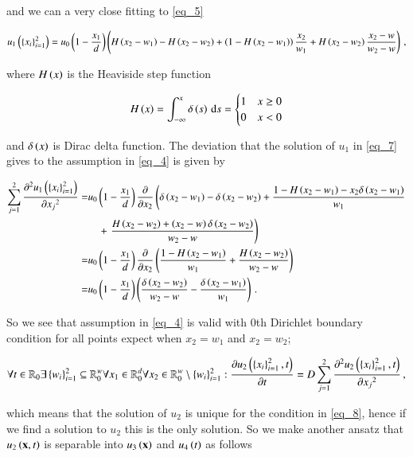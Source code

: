 \documentclass[11pt,english,a4paper]{article}
\begin{document}
\begin{flushleft}
and we can a very close fitting to \eqref{eq_5} 

\begin{align}
u_1\left({\left\lbrace{x_i}\right\rbrace_{i=1}^2}\right) = u_0\left({1-\frac{x_1}{d}}\right)\left({H\left({x_2-w_1}\right)-H\left({x_2-w_2}\right) + \left({1-H\left({x_2-w_1}\right)}\right)\frac{x_2}{w_1} + H\left({x_2-w_2}\right)\frac{x_2-w}{w_2-w}}\right) \,,
\label{eq_7}
\end{align}

where $H\left({x}\right)$ is the Heaviside step function

\begin{align*}
H\left({x}\right) = \int_{-\infty}^x \delta\left({s}\right)\,\mathrm{d}s = \begin{cases} 1 & x \geq 0 \\ 0 & x < 0 \end{cases}
\end{align*}

and $\delta\left({x}\right)$ is Dirac delta function. The deviation that the solution of $u_1$ in \eqref{eq_7} gives to the assumption in \eqref{eq_4} is given by

\begin{align*}
\sum_{j=1}^2 \frac{\partial ^2 u_1\left({\left\lbrace{x_i}\right\rbrace_{i=1}^2}\right)}{\partial {x_j}^2} 
=& u_0\left({1-\frac{x_1}{d}}\right)\frac{\partial}{\partial x_2}\left(\delta\left({x_2-w_1}\right)-\delta\left({x_2-w_2}\right) +\frac{1-H\left({x_2-w_1}\right) -x_2\delta\left({x_2-w_1}\right)}{w_1} \right.
\\
&\quad + \left. \frac{H\left({x_2-w_2}\right)+\left({x_2-w}\right)\delta\left({x_2-w_2}\right)}{w_2-w}\right)
\\
=& u_0\left({1-\frac{x_1}{d}}\right)\frac{\partial}{\partial x_2}\left({\frac{1-H\left({x_2-w_1}\right)}{w_1} + \frac{H\left({x_2-w_2}\right)}{w_2-w}}\right)
\\
=& u_0\left({1-\frac{x_1}{d}}\right)\left({\frac{\delta\left({x_2-w_2}\right)}{w_2-w} - \frac{\delta\left({x_2-w_1}\right)}{w_1}}\right) \,.
\end{align*}

So we see that assumption in \eqref{eq_4} is valid with 0th Dirichlet boundary condition for all points expect when $x_2=w_1$ and $x_2=w_2$;

\begin{align}
\forall t\in \mathbb{R}_0\exists\left\lbrace{w_i}\right\rbrace_{i=1}^2\subseteq \mathbb{R}_0^w \forall x_1\in \mathbb{R}_{0}^d \forall x_2\in\mathbb{R}_0^w \setminus \left\lbrace{w_i}\right\rbrace_{i=1}^2 : \frac{\partial u_2\left({\left\lbrace{x_i}\right\rbrace_{i=1}^2,t}\right)}{\partial t} = D\sum_{j=1}^2\frac{\partial^2 u_2\left({\left\lbrace{x_i}\right\rbrace_{i=1}^2,t}\right)}{\partial {x_j}^2} \,,
\label{eq_8}
\end{align}

which means that the solution of $u_2$ is unique for the condition in \eqref{eq_8}, hence if we find a solution to $u_2$ this is the only solution. So we make another ansatz that $u_2\left({\textbf{x},t}\right)$ is separable into $u_3\left({\textbf{x}}\right)$ and $u_4\left({t}\right)$ as follows


\end{flushleft}
\end{document}
